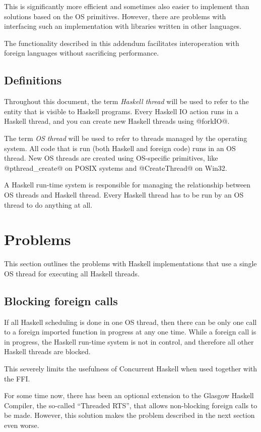 \documentclass[a4paper,twoside]{article}
\begin{document}
This is significantly more efficient and sometimes also easier to implement than solutions
based on the OS primitives. However, there are problems with interfacing such an
implementation with libraries written in other languages.

The functionality described in this addendum facilitates interoperation with foreign
languages without sacrificing performance.

\subsection{Definitions}

Throughout this document, the term \emph{Haskell thread} will be used to refer to the
entity that is visible to Haskell programs. Every Haskell IO action runs in a Haskell thread,
and you can create new Haskell threads using @forkIO@.

The term \emph{OS thread} will be used to refer to threads managed by the operating
system. All code that is run (both Haskell and foreign code) runs in an OS thread. New
OS threads are created using OS-specific primitives, like @pthread\_create@ on POSIX
systems and @CreateThread@ on Win32.

A Haskell run-time system is responsible for managing the relationship between OS threads
and Haskell thread. Every Haskell thread has to be run by an OS thread to do anything at all.

\section{Problems}
 
This section outlines the problems with Haskell implementations that use a single OS thread
for executing all Haskell threads.

\subsection{Blocking foreign calls}
If all Haskell scheduling is done in one OS thread, then there can be only one call to a
foreign imported function in progress at any one time. While a foreign call is in progress,
the Haskell run-time system is not in control, and therefore all other Haskell threads are
blocked.
 
This severely limits the usefulness of Concurrent Haskell when used together with the FFI.

For some time now, there has been an optional extension to the Glasgow Haskell Compiler,
the so-called ``Threaded RTS'', that allows non-blocking foreign calls to be made. However,
this solution makes the problem described in the next section even worse.
 
\end{document}
